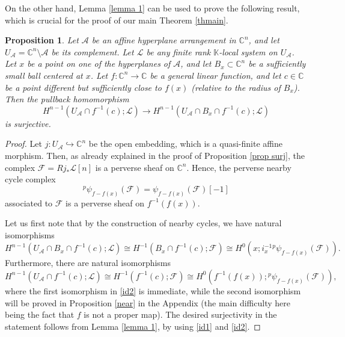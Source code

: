 \documentclass[12pt,leqno,twoside]{amsart}
\theoremstyle{plain}
\newtheorem{prop}[theorem]{Proposition}
\theoremstyle{definition}
\newcommand{\C}{\mathbb{C}}
\newcommand{\K}{\mathbb{K}}
\newcommand{\sA}{\mathcal{A}}
\newcommand{\sL}{\mathcal{L}}
\newcommand{\sF}{\mathcal{F}}
\begin{document}
On the other hand, Lemma \ref{lemma 1}  can be used to prove the following result, which is crucial for the proof of our main Theorem \ref{thmain}.

\begin{prop}\label{prop_surj} Let $\sA$ be an affine hyperplane arrangement in $\C^n$, and let $U_\sA=\C^n \setminus \sA$ be its complement. Let $\sL$ be any finite rank $\K$-local system on $U_{\sA}$. Let $x$ be a point on one of the hyperplanes of $\sA$, and let $B_x\subset \C^n$ be a sufficiently small ball centered at $x$. Let $f\colon \C^n\to \C$ be a general linear function, and let $c\in \C$ be a point different but sufficiently close to $f(x)$ (relative to the radius of $B_x$). 
Then the pullback homomorphism
\[
H^{n-1}(U_\sA\cap f^{-1}(c); \sL)\to H^{n-1}(U_\sA\cap B_x \cap  f^{-1}(c); \sL)
\]
is surjective. 
\end{prop}


\begin{proof}
Let $j\colon U_\sA \hookrightarrow  \C^n$ be the open embedding, which is a quasi-finite affine morphism. Then, as already explained in the proof of Proposition \ref{prop surj}, the complex $\sF=Rj_*\sL[n]$ is a perverse sheaf on $\C^n$. Hence, the perverse nearby cycle complex $${^p}\psi_{f-f(x)}(\sF)=\psi_{f-f(x)}(\sF)[-1]$$ associated to $\sF$ is a perverse sheaf on $f^{-1}(f(x))$. 

Let us first note that by the construction of nearby cycles, we have natural isomorphisms 
\begin{equation}\label{id1}
H^{n-1}(U_\sA\cap B_x \cap  f^{-1}(c); \sL) \cong H^{-1}(B_x \cap f^{-1}(c); \sF) \cong H^0(x; i_x^{-1}{^p}\psi_{f-f(x)}(\sF)).
\end{equation}
Furthermore, there are natural isomorphisms
\begin{equation}\label{id2}
H^{n-1}(U_\sA\cap f^{-1}(c); \sL) \cong H^{-1}(f^{-1}(c); \sF) \cong H^{0}(f^{-1}(f(x)); {^p}\psi_{f-f(x)}(\sF)),
\end{equation}
where the first isomorphism in \eqref{id2} is immediate, while the second isomorphism will be proved in Proposition \ref{near} in the Appendix (the main difficulty here being the fact that $f$ is not a proper map).
The desired surjectivity in the statement follows from Lemma \ref{lemma 1}, by using \eqref{id1} and \eqref{id2}.
\end{proof}
\end{document}
